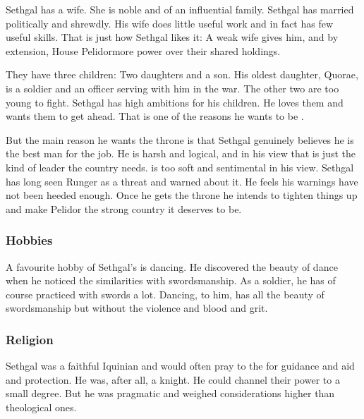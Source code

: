 Sethgal has a wife. 
She is noble and of an influential family. 
Sethgal has married politically and shrewdly. 
His wife does little useful work and in fact has few useful skills. 
That is just how Sethgal likes it: 
A weak wife gives him\dash, and by extension, House Pelidor\dash more power over their shared holdings. 

They have three children: 
Two daughters and a son. 
His oldest daughter, Quorae, is a soldier and an officer serving with him in the war. 
The other two are too young to fight. 
Sethgal has high ambitions for his children. 
He loves them and wants them to get ahead. 
That is one of the reasons he wants to be \rayuth. 

But the main reason he wants the throne is that Sethgal genuinely believes he is the best man for the job. 
He is harsh and logical, and in his view that is just the kind of leader the country needs. 
\Icor{} is too soft and sentimental in his view. 
Sethgal has long seen Runger as a threat and warned about it. 
He feels his warnings have not been heeded enough. 
Once he gets the throne he intends to tighten things up and make Pelidor the strong country it deserves to be. 





\subsubsection{Hobbies}
A favourite hobby of Sethgal's is dancing. 
He discovered the beauty of dance when he noticed the similarities with swordsmanship. 
As a soldier, he has of course practiced with swords a lot. 
Dancing, to him, has all the beauty of swordsmanship but without the violence and blood and grit. 





\subsubsection{Religion}
Sethgal was a faithful Iquinian and would often pray to the \sephiroth for guidance and aid and protection.
He was, after all, a knight. 
He could channel their power to a small degree. 
But he was pragmatic and weighed  considerations higher than theological ones. 









